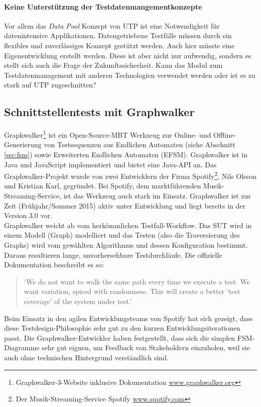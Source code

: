 \paragraph{Keine Unterstützung der Testdatenmangementkonzepte}
Vor allem das \textit{Data Pool} Konzept von \Gls{UTP} ist eine Notwendigkeit für datenintensive Applikationen. Datengetriebene Testfälle müssen durch ein flexibles und zuverlässiges Konzept gestützt werden. Auch hier müsste eine Eigenentwicklung erstellt werden. Diese ist aber nicht nur aufwendig, sondern es stellt sich auch die Frage der Zukunftssicherheit. Kann das Modul zum Testdatenmanagement mit anderen Technologien verwendet werden oder ist es zu stark auf \Gls{UTP} zugeschnitten?

\subsection{Schnittstellentests mit Graphwalker}
\label{sec:graphwalker}
Graphwalker\footnote{Graphwalker-3-Website inklusive Dokumentation \url{www.graphwalker.org}} ist ein Open-Source-\Gls{MBT} Werkzeug zur Online- und Offline-Generierung von Testsequenzen aus Endlichen Automaten (siehe Abschnitt \ref{sec:fsm}) sowie Erweiterten Endlichen Automaten (EFSM). Graphwalker ist in Java und JavaScript implementiert und bietet eine Java-API an. Das Graphwalker-Projekt wurde von zwei Entwicklern der Firma Spotify\footnote{Der Musik-Streaming-Service Spotify \url{www.spotify.com}}, Nils Olsson und Kristian Karl, gegründet. Bei Spotify, dem marktführenden Musik-Streaming-Service, ist das Werkzeug auch stark im Einsatz. Graphwalker ist zur Zeit (Frühjahr/Sommer 2015) aktiv unter Entwicklung und liegt bereits in der Version 3.0 vor.\\
Graphwalker weicht ab vom herkömmlichen Testfall-Workflow. Das \Gls{SUT} wird in einem Modell (Graph) modelliert und das Testen (also die Traversierung des Graphs) wird vom gewählten Algorithmus und dessen Konfiguration bestimmt. Daraus resultieren lange, unvorhersehbare Testdurchläufe. Die offizielle Dokumentation beschreibt es so:

\begin{quote}
`We do not want to walk the same path every time we execute a test. We want variation, spiced with randomness. This will create a better `test coverage' of the system under test.' \cite{_graphwalker_2015}
\end{quote}

Beim Einsatz in den agilen Entwicklungsteams von Spotify hat sich gezeigt, dass diese Testdesign-Philosophie sehr gut zu den kurzen Entwicklungsiterationen passt. Die Graphwalker-Entwickler haben festgestellt, dass sich die simplen \Gls{FSM}-Diagramme sehr gut eignen, um Feedback von Stakeholdern einzuholen, weil sie auch ohne technischen Hintergrund verständlich sind.

